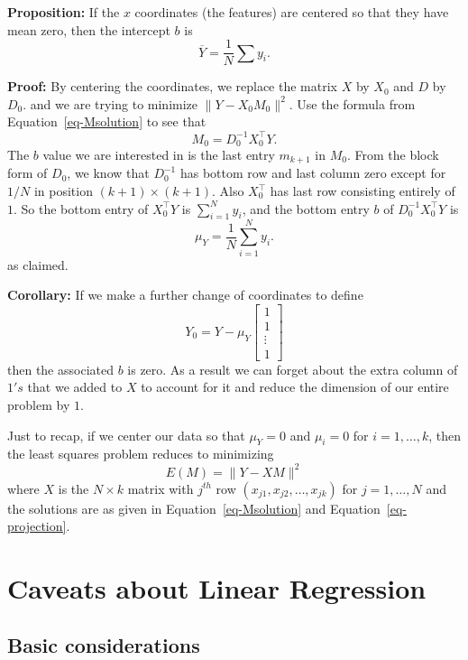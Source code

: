 \documentclass[
  11pt,
  letterpaper,
]{scrbook}
\theoremstyle{plain}
\theoremstyle{plain}
\theoremstyle{remark}
\begin{document}
\textbf{Proposition:} If the \(x\) coordinates (the features) are
centered so that they have mean zero, then the intercept \(b\) is
\[ \overline{Y} =
\frac{1}{N}\sum y_{i}.  \]

\textbf{Proof:} By centering the coordinates, we replace the matrix
\(X\) by \(X_{0}\) and \(D\) by \(D_{0}\). and we are trying to minimize
\(\|Y-X_{0}M_{0}\|^2\). Use the formula from Equation~\ref{eq-Msolution}
to see that \[ M_{0} = D_{0}^{-1}X_{0}^{\intercal}Y.  \] The \(b\) value
we are interested in is the last entry \(m_{k+1}\) in \(M_{0}\). From
the block form of \(D_{0}\), we know that \(D_{0}^{-1}\) has bottom row
and last column zero except for \(1/N\) in position
\((k+1)\times(k+1)\). Also \(X_{0}^{\intercal}\) has last row consisting
entirely of \(1\). So the bottom entry of \(X_{0}^{\intercal}Y\) is
\(\sum_{i=1}^{N} y_{i}\), and the bottom entry \(b\) of
\(D_{0}^{-1}X_{0}^{\intercal}Y\) is \[ \mu_{Y} =
\frac{1}{N}\sum_{i=1}^{N} y_{i}.  \] as claimed.

\textbf{Corollary:} If we make a further change of coordinates to define
\[
Y_{0} = Y - \mu_{Y}\left[\begin{matrix} 1 \\ 1 \\ \vdots \\
1\end{matrix}\right] \] then the associated \(b\) is zero. As a result
we can forget about the extra column of \(1's\) that we added to \(X\)
to account for it and reduce the dimension of our entire problem by
\(1\).

Just to recap, if we center our data so that \(\mu_{Y}=0\) and
\(\mu_{i}=0\) for \(i=1,\ldots, k\), then the least squares problem
reduces to minimizing \[ E(M) = \|Y-XM\|^2 \] where \(X\) is the
\(N\times k\) matrix with \(j^{th}\) row
\((x_{j1},x_{j2},\ldots, x_{jk})\) for \(j=1,\ldots, N\) and the
solutions are as given in Equation~\ref{eq-Msolution} and
Equation~\ref{eq-projection}.

\hypertarget{caveats-about-linear-regression}{%
\section{Caveats about Linear
Regression}\label{caveats-about-linear-regression}}

\hypertarget{basic-considerations}{%
\subsection{Basic considerations}\label{basic-considerations}}
\end{document}
